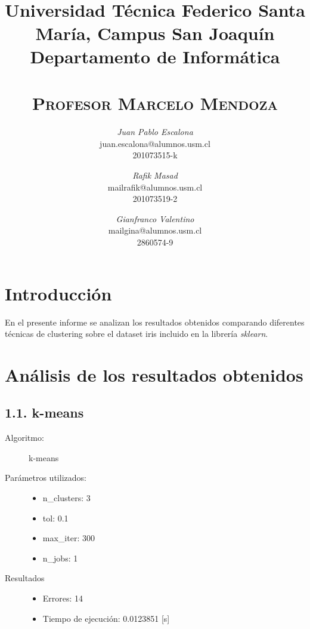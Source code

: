 \documentclass{article}
\title{
  \Large\textmd{\textbf{\tareaRamo\\ \tareaTitulo}}\\
  \vspace{0.1in}
  \normalsize
  Universidad Técnica Federico Santa María, Campus San Joaquín\\
  Departamento de Informática\\
  \vspace{0.1in}
  \small{\textsc{\tareaFecha}}\\
  \vspace{0.1in}
  \large{\textsc{Profesor Marcelo Mendoza}}
  \vspace{1.5in}
}
\author{
    \textit{Juan Pablo Escalona} \\
    \small{juan.escalona@alumnos.usm.cl} \\
    \small{201073515-k}
    \and
    \textit{Rafik Masad} \\
    \small{mailrafik@alumnos.usm.cl} \\
    \small{201073519-2}
    \and
    \textit{Gianfranco Valentino}\\
    \small{mailgina@alumnos.usm.cl}\\
    \small{2860574-9}
}
\date{}
\begin{document}
\maketitle
\newpage


\section*{Introducción}

En el presente informe se analizan los resultados obtenidos comparando diferentes técnicas de clustering sobre el dataset iris incluido en la librería \textit{sklearn}.

\section*{Análisis de los resultados obtenidos}

\subsection*{1.1. \; k-means}

\begin{description}
  \item[Algoritmo:] k-means
  \item[Parámetros utilizados:] \hfill
    \begin{itemize}
      \item n\_clusters: 3
      \item tol: 0.1
      \item max\_iter: 300
      \item n\_jobs: 1
    \end{itemize}
  \item[Resultados]\hfill
    \begin{itemize}
      \item Errores: 14
      \item Tiempo de ejecución: 0.0123851 [s]
    \end{itemize}
\end{description}
\end{document}
